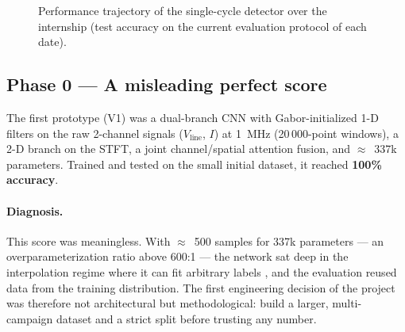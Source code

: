 \begin{figure}[H]
\centering
{}
\caption{Performance trajectory of the single-cycle detector over the internship (test accuracy on the current evaluation protocol of each date).}
\label{fig:timeline}
\end{figure}

\subsection{Phase 0 --- A misleading perfect score}

The first prototype (V1) was a dual-branch CNN with Gabor-initialized 1-D filters on the raw 2-channel signals ($V_{\text{line}}$, $I$) at 1~MHz (20\,000-point windows), a 2-D branch on the STFT, a joint channel/spatial attention fusion, and $\approx$~337k parameters. Trained and tested on the small initial dataset, it reached \textbf{100\% accuracy}.

\paragraph{Diagnosis.} This score was meaningless. With $\approx$~500 samples for 337k parameters --- an overparameterization ratio above 600:1 --- the network sat deep in the interpolation regime where it can fit arbitrary labels \cite{zhang2017rethinking}, and the evaluation reused data from the training distribution. The first engineering decision of the project was therefore not architectural but methodological: build a larger, multi-campaign dataset and a strict split before trusting any number.

